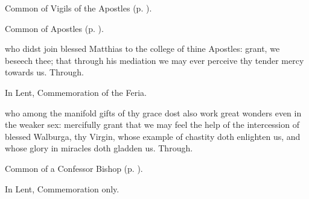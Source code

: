 \label{MatthiasVigil}

\begin{rubric}
	Common of Vigils of the Apostles (p. \pageref{CommonVigilApostles}).
\end{rubric}



\begin{rubric}
	Common of Apostles (p. \pageref{CommonApostles}).
\end{rubric}

 who didst join blessed Matthias to the college of thine Apostles: grant, we beseech thee; that through his mediation we may ever perceive thy tender mercy towards us. Through.
\begin{rubric}
    In Lent, Commemoration of the Feria.
\end{rubric}


\clearpage
{}


\memorialCollect
{} who among the manifold gifts of thy grace dost also work great wonders even in the weaker sex: mercifully grant that we may feel the help of the intercession of blessed Walburga, thy Virgin, whose example of chastity doth enlighten us, and whose glory in miracles doth gladden us. Through.



\begin{rubric}
	Common of a Confessor Bishop (p. \pageref{ConfessorBishopCollect}).
\end{rubric}



\begin{rubric}
	In Lent, Commemoration only.
\end{rubric}

